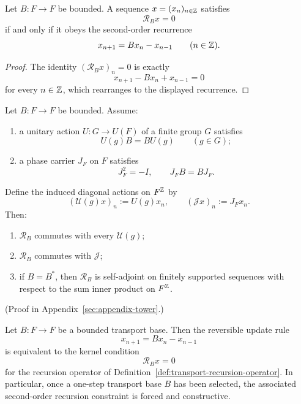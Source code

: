 \begin{lemma}
\label{lem:transport-recursion-kernel}
Let $B:F\to F$ be bounded. A sequence $x=(x_n)_{n\in\mathbb{Z}}$ satisfies
\[
\mathcal R_Bx=0
\]
if and only if it obeys the second-order recurrence
\[
x_{n+1}=Bx_n-x_{n-1}
\qquad(n\in\mathbb{Z}).
\]
\end{lemma}

\begin{proof}
The identity $(\mathcal R_Bx)_n=0$ is exactly
\[
x_{n+1} - Bx_n + x_{n-1}=0
\]
for every $n\in\mathbb{Z}$, which rearranges to the displayed recurrence.
\end{proof}

\begin{proposition}
\label{prop:transport-recursion-compatibility}
Let $B:F\to F$ be bounded. Assume:
\begin{enumerate}[label=(\roman*), leftmargin=2em, itemsep=0.2em]
\item a unitary action $U:G\to U(F)$ of a finite group $G$ satisfies
      \[
      U(g)B=BU(g)
      \qquad(g\in G);
      \]
\item a phase carrier $J_F$ on $F$ satisfies
      \[
      J_F^2=-I,
      \qquad
      J_FB=BJ_F.
      \]
\end{enumerate}
Define the induced diagonal actions on $F^{\mathbb{Z}}$ by
\[
(\mathcal U(g)x)_n:=U(g)x_n,
\qquad
(\mathcal Jx)_n:=J_Fx_n.
\]
Then:
\begin{enumerate}[label=(\alph*), leftmargin=2em, itemsep=0.2em]
\item $\mathcal R_B$ commutes with every $\mathcal U(g)$;
\item $\mathcal R_B$ commutes with $\mathcal J$;
\item if $B=B^*$, then $\mathcal R_B$ is self-adjoint on finitely supported
      sequences with respect to the sum inner product on $F^{\mathbb{Z}}$.
\end{enumerate}
\end{proposition}

(Proof in Appendix~\ref{sec:appendix-tower}.)

\begin{theorem}
\label{thm:reversible-transport-recursion}
Let $B:F\to F$ be a bounded transport base. Then the reversible update rule
\[
x_{n+1}=Bx_n-x_{n-1}
\]
is equivalent to the kernel condition
\[
\mathcal R_Bx=0
\]
for the recursion operator of
Definition~\ref{def:transport-recursion-operator}. In particular, once a
one-step transport base $B$ has been selected, the associated second-order
recursion constraint is forced and constructive.
\end{theorem}

